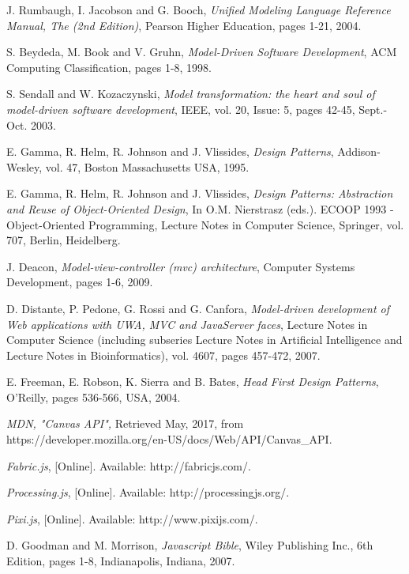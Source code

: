 \begin{thebibliography}{1}
	 J. Rumbaugh, I. Jacobson and G. Booch, {\em Unified Modeling Language Reference Manual, The (2nd Edition)}, Pearson Higher Education, pages 1-21, 2004.
	
	 S. Beydeda, M. Book and V. Gruhn, {\em Model-Driven Software Development}, ACM Computing Classification, pages 1-8, 1998.
	
	 S. Sendall and W. Kozaczynski, {\em Model transformation: the heart and soul of model-driven software development},  IEEE, vol. 20, Issue: 5, pages 42-45, Sept.-Oct. 2003.
	
	 E. Gamma, R. Helm, R. Johnson and J. Vlissides, {\em Design Patterns}, Addison-Wesley, vol. 47, Boston Massachusetts USA, 1995.
	
	 E. Gamma, R. Helm, R. Johnson and J. Vlissides, {\em Design Patterns: Abstraction and Reuse of Object-Oriented Design}, In O.M. Nierstrasz (eds.). ECOOP 1993 - Object-Oriented Programming, Lecture Notes in Computer Science, Springer, vol. 707, Berlin, Heidelberg.
	
	 J. Deacon, { \em Model-view-controller (mvc) architecture}, Computer Systems Development, pages 1-6, 2009.
	
	 D. Distante, P. Pedone, G. Rossi and G. Canfora, { \em Model-driven development of Web applications with UWA, MVC and JavaServer faces}, Lecture Notes in Computer Science (including subseries Lecture Notes in Artificial Intelligence and Lecture Notes in Bioinformatics), vol. 4607, pages 457-472, 2007.
	
	 E. Freeman, E. Robson, K. Sierra and B. Bates, { \em Head First Design Patterns}, O'Reilly, pages 536-566, USA, 2004.
	
	 {\em MDN, "Canvas API",} Retrieved May, 2017, from https://developer.mozilla.org/en-US/docs/Web/API/Canvas\_API.
	
	 {\em Fabric.js}, [Online]. Available: http://fabricjs.com/.
	
	 {\em Processing.js}, [Online]. Available: http://processingjs.org/.
	
	 {\em Pixi.js}, [Online]. Available: http://www.pixijs.com/.
	
	 D. Goodman and M. Morrison, {\em Javascript Bible}, Wiley Publishing Inc., 6th Edition, pages 1-8, Indianapolis, Indiana, 2007.
	

\end{thebibliography}

